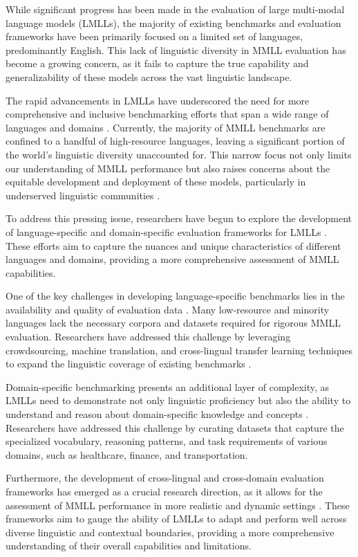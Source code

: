 \documentclass[11pt]{article}
\begin{document}
While significant progress has been made in the evaluation of large multi-modal language models (LMLLs), the majority of existing benchmarks and evaluation frameworks have been primarily focused on a limited set of languages, predominantly English. This lack of linguistic diversity in MMLL evaluation has become a growing concern, as it fails to capture the true capability and generalizability of these models across the vast linguistic landscape.

The rapid advancements in LMLLs have underscored the need for more comprehensive and inclusive benchmarking efforts that span a wide range of languages and domains \cite{ref153,ref154}. Currently, the majority of MMLL benchmarks are confined to a handful of high-resource languages, leaving a significant portion of the world's linguistic diversity unaccounted for. This narrow focus not only limits our understanding of MMLL performance but also raises concerns about the equitable development and deployment of these models, particularly in underserved linguistic communities \cite{ref155,ref62}.

To address this pressing issue, researchers have begun to explore the development of language-specific and domain-specific evaluation frameworks for LMLLs \cite{ref156,ref157}. These efforts aim to capture the nuances and unique characteristics of different languages and domains, providing a more comprehensive assessment of MMLL capabilities.

One of the key challenges in developing language-specific benchmarks lies in the availability and quality of evaluation data \cite{ref66}. Many low-resource and minority languages lack the necessary corpora and datasets required for rigorous MMLL evaluation. Researchers have addressed this challenge by leveraging crowdsourcing, machine translation, and cross-lingual transfer learning techniques to expand the linguistic coverage of existing benchmarks \cite{ref153,ref62}.

Domain-specific benchmarking presents an additional layer of complexity, as LMLLs need to demonstrate not only linguistic proficiency but also the ability to understand and reason about domain-specific knowledge and concepts \cite{ref158,ref159}. Researchers have addressed this challenge by curating datasets that capture the specialized vocabulary, reasoning patterns, and task requirements of various domains, such as healthcare, finance, and transportation.

Furthermore, the development of cross-lingual and cross-domain evaluation frameworks has emerged as a crucial research direction, as it allows for the assessment of MMLL performance in more realistic and dynamic settings \cite{ref160,ref161}. These frameworks aim to gauge the ability of LMLLs to adapt and perform well across diverse linguistic and contextual boundaries, providing a more comprehensive understanding of their overall capabilities and limitations.
\end{document}
